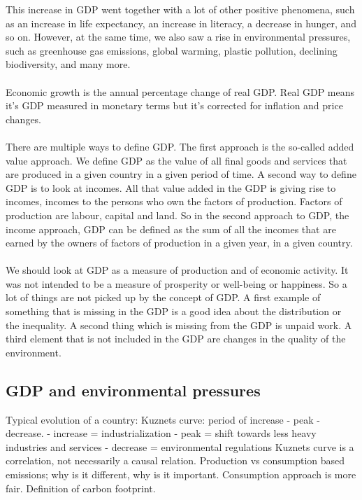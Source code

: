 \documentclass[../summary.tex]{subfiles}
\begin{document}
	\newpage
	This increase in GDP went together with a lot of other positive phenomena, such as an increase in life expectancy, an increase in literacy, a decrease in hunger, and so on. However, at the same time, we also saw a rise in environmental pressures, such as greenhouse gas emissions, global warming, plastic pollution, declining biodiversity, and many more. 
	\\\\
	Economic growth is the annual percentage change of real GDP. Real GDP means it's GDP measured in monetary terms but it's corrected for inflation and price changes.
	\\\\
	There are multiple ways to define GDP. The first approach is the so-called added value approach. We define GDP as the value of all final goods and services that are produced in a given country in a given period of time. A second way to define GDP is to look at incomes. All that value added in the GDP is giving rise to incomes, incomes to the persons who own the factors of production. Factors of production are labour, capital and land. So in the second approach to GDP, the income approach, GDP can be defined as the sum of all the incomes that are earned by the owners of factors of production in a given year, in a given country. 
	\\\\
	We should look at GDP as a measure of production and of economic activity. It was not intended to be a measure of prosperity or well-being or happiness. So a lot of things are not picked up by the concept of GDP. A first example of something that is missing in the GDP is a good idea about the distribution or the inequality. A second thing which is missing from the GDP is unpaid work. A third element that is not included in the GDP are changes in the quality of the environment.

	\subsection{GDP and environmental pressures}
	
	Typical evolution of a country: Kuznets curve: period of increase - peak - decrease.
	- increase = industrialization
	- peak = shift towards less heavy industries and services
	- decrease = environmental regulations
	Kuznets curve is a correlation, not necessarily a causal relation.
	Production vs consumption based emissions; why is it different, why is it important.
	Consumption approach is more fair.
	Definition of carbon footprint.
	
\end{document}
